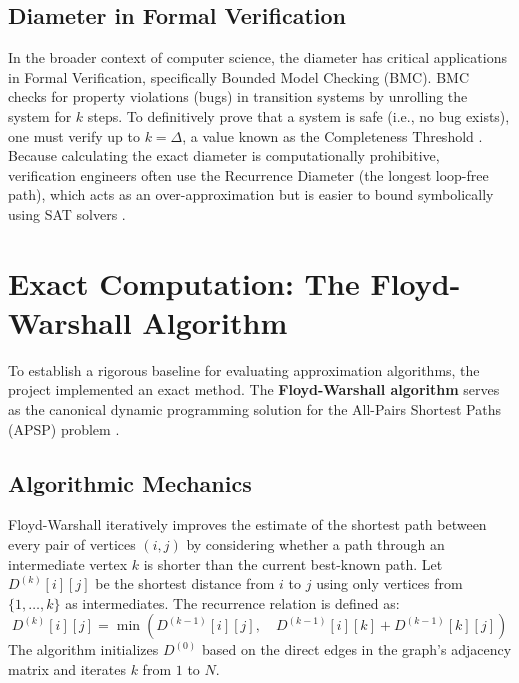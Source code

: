 \subsection{Diameter in Formal Verification}
In the broader context of computer science, the diameter has critical applications in Formal Verification, specifically Bounded Model Checking (BMC). BMC checks for property violations (bugs) in transition systems by unrolling the system for $k$ steps. To definitively prove that a system is safe (i.e., no bug exists), one must verify up to $k = \Delta$, a value known as the Completeness Threshold \cite{compthresh}. Because calculating the exact diameter is computationally prohibitive, verification engineers often use the Recurrence Diameter (the longest loop-free path), which acts as an over-approximation but is easier to bound symbolically using SAT solvers \cite{kroening05}.

\section{Exact Computation: The Floyd-Warshall Algorithm}
To establish a rigorous baseline for evaluating approximation algorithms, the project implemented an exact method. The \textbf{Floyd-Warshall algorithm} serves as the canonical dynamic programming solution for the All-Pairs Shortest Paths (APSP) problem \cite{finalroundFW}.

\subsection{Algorithmic Mechanics}
Floyd-Warshall iteratively improves the estimate of the shortest path between every pair of vertices $(i, j)$ by considering whether a path through an intermediate vertex $k$ is shorter than the current best-known path. Let $D^{(k)}[i][j]$ be the shortest distance from $i$ to $j$ using only vertices from $\{1, \dots, k\}$ as intermediates. The recurrence relation is defined as:
\[
D^{(k)}[i][j] = \min(D^{(k-1)}[i][j], \quad D^{(k-1)}[i][k] + D^{(k-1)}[k][j])
\]
The algorithm initializes $D^{(0)}$ based on the direct edges in the graph's adjacency matrix and iterates $k$ from $1$ to $N$.

